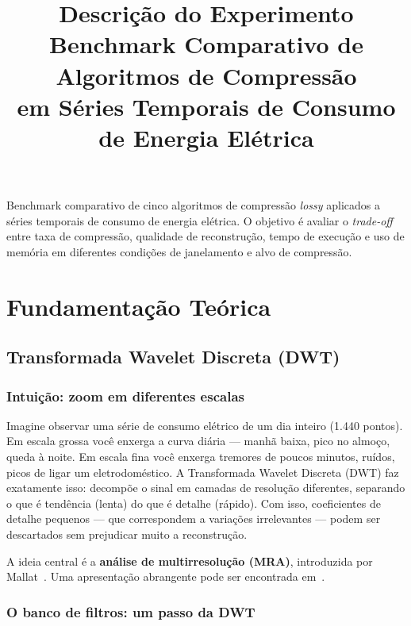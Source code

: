 \documentclass[12pt, a4paper]{article}
\title{\textbf{Descrição do Experimento}\\[0.5em]
\large Benchmark Comparativo de Algoritmos de Compressão\\
em Séries Temporais de Consumo de Energia Elétrica}
\author{}
\date{}
\begin{document}
\maketitle
\tableofcontents
\newpage

Benchmark comparativo de cinco algoritmos de compressão \textit{lossy} aplicados a séries temporais de consumo de energia elétrica. O objetivo é avaliar o \textit{trade-off} entre taxa de compressão, qualidade de reconstrução, tempo de execução e uso de memória em diferentes condições de janelamento e alvo de compressão.

\section{Fundamentação Teórica}

\subsection{Transformada Wavelet Discreta (DWT)}

\subsubsection{Intuição: zoom em diferentes escalas}

Imagine observar uma série de consumo elétrico de um dia inteiro (1.440 pontos). Em escala grossa você enxerga a curva diária — manhã baixa, pico no almoço, queda à noite. Em escala fina você enxerga tremores de poucos minutos, ruídos, picos de ligar um eletrodoméstico. A Transformada Wavelet Discreta (DWT) faz exatamente isso: decompõe o sinal em camadas de resolução diferentes, separando o que é tendência (lenta) do que é detalhe (rápido). Com isso, coeficientes de detalhe pequenos — que correspondem a variações irrelevantes — podem ser descartados sem prejudicar muito a reconstrução.

A ideia central é a \textbf{análise de multirresolução (MRA)}, introduzida por Mallat~\cite{mallat1989theory}. Uma apresentação abrangente pode ser encontrada em~\cite{mallat2008wavelet}.

\subsubsection{O banco de filtros: um passo da DWT}
\end{document}
